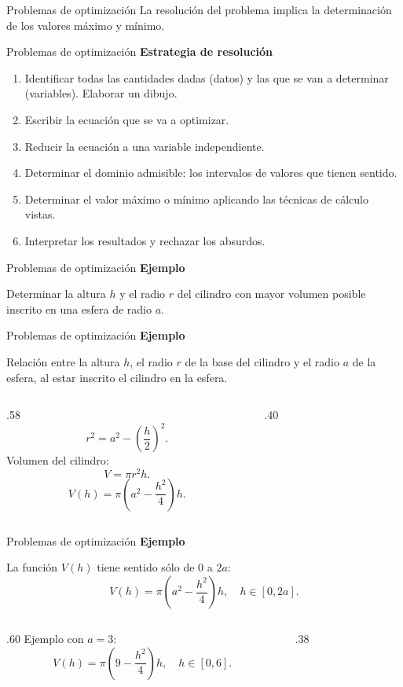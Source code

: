 \documentclass[main.tex]{subfiles}
\begin{document}
\begin{frame}{Problemas de optimización}
La resolución del problema implica la determinación de los valores máximo y mínimo.
\end{frame}
\begin{frame}{Problemas de optimización}
\small\textbf{Estrategia de resolución}
\begin{enumerate}
\item Identificar todas las cantidades dadas (datos) y las que se van a determinar (variables). Elaborar un dibujo.
\item Escribir la ecuación que se va a optimizar.
\item Reducir la ecuación a una variable independiente.
\item Determinar el dominio admisible: los intervalos de valores que tienen sentido.
\item Determinar el valor máximo o mínimo aplicando las técnicas de cálculo vistas.
\item Interpretar los resultados y rechazar los absurdos.
\end{enumerate}
\end{frame}
\begin{frame}{Problemas de optimización}
\textbf{Ejemplo}\par Determinar la altura $h$ y el radio $r$ del cilindro con mayor volumen posible inscrito en una esfera de radio $a$.
\end{frame}
\begin{frame}{Problemas de optimización}
\small\textbf{Ejemplo}\par Relación entre la altura $h$, el radio $r$ de la base del cilindro y el radio $a$ de la esfera, al estar inscrito el cilindro en la esfera.
\begin{columns}[c]
\begin{column}{.58\textwidth}
\[r^2=a^2-\left(\frac h2\right)^2.\]
Volumen del cilindro:
\[V=\pi r^2h.\]
\[V(h)=\pi\left(a^2-\frac{h^2}{4}\right)h.\]
\end{column}
\begin{column}{.40\textwidth}\end{column}
\end{columns}
\end{frame}
\begin{frame}{Problemas de optimización}
\small\textbf{Ejemplo}\par La función $V(h)$ tiene sentido sólo de $0$ a $2a$:
\[V(h)=\pi\left(a^2-\frac{h^2}{4}\right)h,\quad h\in[0,2a].\]
\begin{columns}[c]
\begin{column}{.60\textwidth}
Ejemplo con $a=3$:
\[V(h)=\pi\left(9-\frac{h^2}{4}\right)h,\quad h\in[0,6].\]
\end{column}
\begin{column}{.38\textwidth}\end{column}
\end{columns}
\end{frame}
\end{document}
